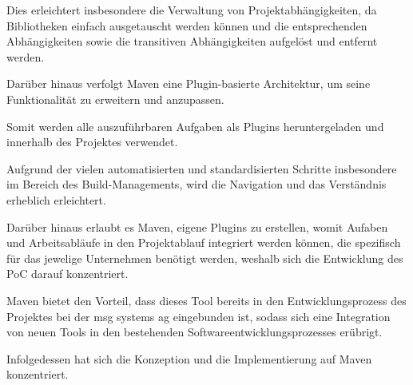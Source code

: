 Dies erleichtert insbesondere die Verwaltung von Projektabhängigkeiten, da Bibliotheken einfach ausgetauscht werden können und die entsprechenden Abhängigkeiten sowie die transitiven Abhängigkeiten aufgelöst und entfernt werden.

Darüber hinaus verfolgt Maven eine Plugin-basierte Architektur, um seine Funktionalität zu erweitern und anzupassen. 

Somit werden alle auszuführbaren Aufgaben als Plugins heruntergeladen und innerhalb des Projektes verwendet. 

Aufgrund der vielen automatisierten und standardisierten Schritte insbesondere im Bereich des Build-Managements, wird die Navigation und das Verständnis erheblich erleichtert.  

Darüber hinaus erlaubt es Maven, eigene Plugins zu erstellen, womit Aufaben und Arbeitsabläufe in den Projektablauf integriert werden können, die spezifisch für das jewelige Unternehmen benötigt werden, weshalb sich die Entwicklung des PoC darauf konzentriert.

Maven bietet den Vorteil, dass dieses Tool bereits in den Entwicklungsprozess des Projektes bei der msg systems ag eingebunden ist, sodass sich eine Integration von neuen Tools in den bestehenden Softwareentwicklungsprozesses erübrigt.

Infolgedessen hat sich die Konzeption und die Implementierung auf Maven konzentriert.  

